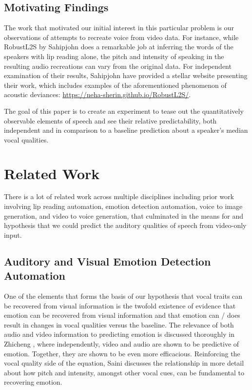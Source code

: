 \documentclass[10pt,twocolumn,letterpaper]{article}
\begin{document}
\subsection{Motivating Findings}

The work that motivated our initial interest in this particular problem is our observations of attempts to  recreate voice from video data. For instance, while RobustL2S by Sahipjohn  \cite{RobustL2S} does a remarkable job at inferring the words of the speakers with lip reading alone, the pitch and intensity of speaking in the resulting audio recreations can vary from the original data. For independent examination of their results, Sahipjohn  have provided a stellar website presenting their work, which includes examples of the aforementioned phenomenon of acoustic deviances: \href{https://neha-sherin.github.io/RobustL2S/}{https://neha-sherin.github.io/RobustL2S/}.

The goal of this paper is to create an experiment to tease out the quantitatively observable elements of speech and see their relative predictability, both independent and in comparison to a baseline prediction about a speaker's median vocal qualities.  

\section{Related Work}
\label{sec:related}

There is a lot of related work across multiple disciplines including prior work involving lip reading automation, emotion detection automation, voice to image generation, and video to voice generation, that culminated in the means for and hypothesis that we could predict the auditory qualities of speech from video-only input.


\subsection{Auditory and Visual Emotion Detection Automation}

One of the elements that forms the basis of our hypothesis that vocal traits can be recovered from visual information is the twofold existence of evidence that emotion can be recovered from visual information and that emotion can / does result in changes in vocal qualities versus the baseline. The relevance of both audio and video information to predicting emotion is discussed thoroughly in Zhicheng  \cite{EmotVid2023}, where independently, video and audio are shown to be predictive of emotion. Together, they are shown to be even more efficacious. Reinforcing the vocal quality side of the equation, Saini \cite{EmotPitch2023} discusses the relationship in more detail about how pitch and intensity, amongst other vocal cues, can be fundamental to recovering emotion.
\end{document}
